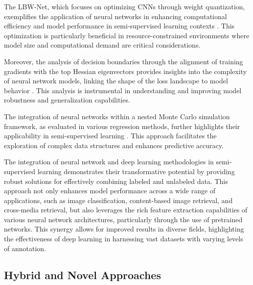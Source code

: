 The LBW-Net, which focuses on optimizing CNNs through weight quantization, exemplifies the application of neural networks in enhancing computational efficiency and model performance in semi-supervised learning contexts \cite{yin2017quantizationtraininglowbitwidth}. This optimization is particularly beneficial in resource-constrained environments where model size and computational demand are critical considerations.



Moreover, the analysis of decision boundaries through the alignment of training gradients with the top Hessian eigenvectors provides insights into the complexity of neural network models, linking the shape of the loss landscape to model behavior \cite{sabanayagam2023unveilinghessiansconnectiondecision}. This analysis is instrumental in understanding and improving model robustness and generalization capabilities.



The integration of neural networks within a nested Monte Carlo simulation framework, as evaluated in various regression methods, further highlights their applicability in semi-supervised learning \cite{kun2022mathematicalfoundationsregressionmethods}. This approach facilitates the exploration of complex data structures and enhances predictive accuracy.



The integration of neural network and deep learning methodologies in semi-supervised learning demonstrates their transformative potential by providing robust solutions for effectively combining labeled and unlabeled data. This approach not only enhances model performance across a wide range of applications, such as image classification, content-based image retrieval, and cross-media retrieval, but also leverages the rich feature extraction capabilities of various neural network architectures, particularly through the use of pretrained networks. This synergy allows for improved results in diverse fields, highlighting the effectiveness of deep learning in harnessing vast datasets with varying levels of annotation. \cite{zhao2017multiplesourcedomainadaptation,pihlgren2024systematicperformanceanalysisdeep}



\subsection{Hybrid and Novel Approaches} \label{subsec:Hybrid and Novel Approaches}

